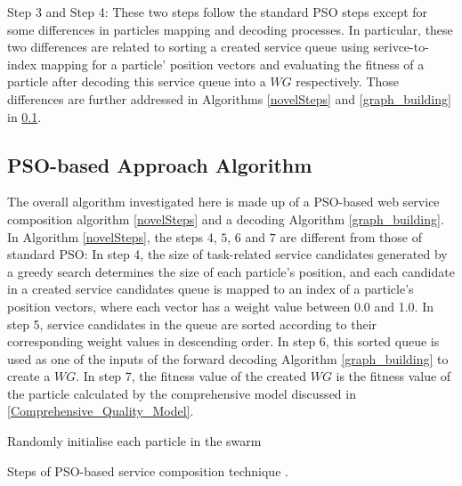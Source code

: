 \documentclass{llncs}
\begin{document}
Step 3 and Step 4: These two steps follow the standard PSO steps \cite{shi2001particle} except for some differences in particles mapping and decoding processes. In particular, these two differences are related to sorting a created service queue using serivce-to-index mapping for a particle' position vectors and evaluating the fitness of a particle after decoding this service queue into a $WG$ respectively. Those differences are further addressed in Algorithms \ref{novelSteps} and \ref{graph_building} in \ref{POS-based_algomargin}.

\subsection{PSO-based Approach Algorithm}\label{POS-based_algomargin}
The overall algorithm investigated here is made up of a PSO-based web service composition algorithm \ref{novelSteps} and a decoding Algorithm \ref{graph_building}. In Algorithm \ref{novelSteps}, the  steps $4$, $5$, $6$ and $7$ are different from those of standard PSO: In step 4, the size of task-related service candidates generated by a greedy search determines the size of each particle's position, and each candidate in a created service candidates queue is mapped to an index of a particle’s position vectors, where each vector has a weight value between 0.0 and 1.0. In step 5, service candidates in the queue are sorted according to their corresponding weight values in descending order. In step 6, this sorted queue is used as one of the inputs of the forward decoding Algorithm \ref{graph_building} to create a $WG$. In step 7, the fitness value of the created $WG$ is the fitness value of the particle calculated by the comprehensive model discussed in \ref{Comprehensive_Quality_Model}.
\vspace{-0.5cm}
\begin{algorithm}
 \SetNlSty{}{}{:}
 Randomly initialise each particle in the swarm\;
\caption{Steps of PSO-based service composition technique \cite{da2016particle}.}
\label{novelSteps}
\end{algorithm} 
\end{document}
